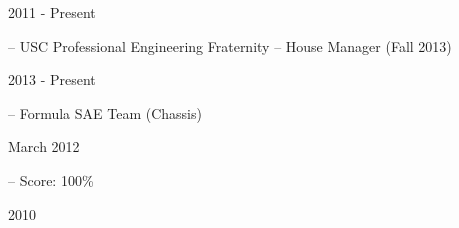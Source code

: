 

\flushleft \begin{minipage}[t]{\dateColWidth}
2011 - Present
\end{minipage}
\begin{minipage}[t]{0.8\textwidth}
 -- USC Professional Engineering Fraternity -- House Manager (Fall 2013)
\end{minipage}

\flushleft \begin{minipage}[t]{\dateColWidth}
2013 - Present
\end{minipage}
\begin{minipage}[t]{0.8\textwidth}
 -- Formula SAE Team (Chassis)
\end{minipage}

\flushleft \begin{minipage}[t]{\dateColWidth}
March 2012
\end{minipage}
\begin{minipage}[t]{0.8\textwidth}
 -- Score: 100\%
\end{minipage}

\flushleft \begin{minipage}[t]{\dateColWidth}
2010
\end{minipage}
\begin{minipage}[t]{0.8\textwidth}
\end{minipage}













